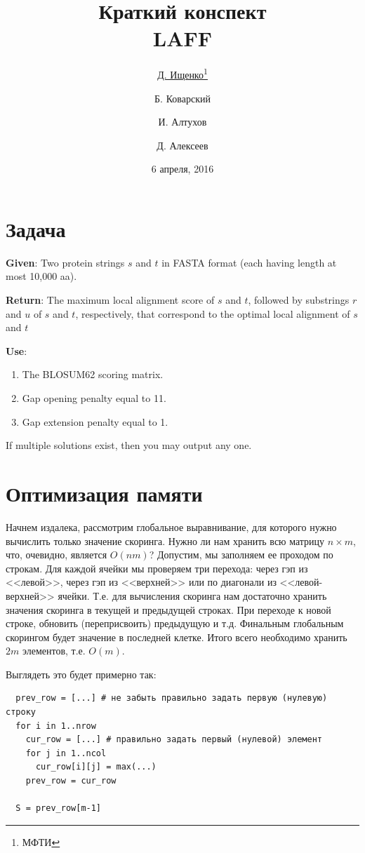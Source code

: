 \documentclass[letterpaper, 11pt]{article}
\title{\large{Краткий конспект}\\
\LARGE{LAFF}}
\date{6 апреля, 2016}
\author{\underline{Д. Ищенко\thanks{МФТИ}} \and Б. Коварский\footnotemark[1]
\and И. Алтухов\footnotemark[1] \and Д. Алексеев\footnotemark[1]}
\begin{document}
\maketitle
\thispagestyle{empty}
\clearpage

\section{Задача}

\textbf{Given}: Two protein strings $s$ and $t$ in FASTA format (each having length at most 10,000 aa).

\textbf{Return}: The maximum local alignment score of $s$ and $t$, followed by substrings $r$ and $u$ of $s$ and $t$, respectively, that correspond to the optimal local alignment of $s$ and $t$

\textbf{Use}:
\begin{enumerate}
\item
The BLOSUM62 scoring matrix.
\item
Gap opening penalty equal to 11.
\item
Gap extension penalty equal to 1.
\end{enumerate}

If multiple solutions exist, then you may output any one.

\section{Оптимизация памяти}
Начнем издалека, рассмотрим глобальное выравнивание, для которого нужно вычислить только значение скоринга. Нужно ли нам хранить всю матрицу $n \times m$, что, очевидно, является $O(nm)$? Допустим, мы заполняем ее проходом по строкам. Для каждой ячейки мы проверяем три перехода: через гэп из <<левой>>, через гэп из <<верхней>> или по диагонали из <<левой-верхней>> ячейки. Т.е. для вычисления скоринга нам достаточно хранить значения скоринга в текущей и предыдущей строках. При переходе к новой строке, обновить (переприсвоить) предыдущую и т.д. Финальным глобальным скорингом будет значение в последней клетке. Итого всего необходимо хранить $2m$ элементов, т.е. $O(m)$.

Выглядеть это будет примерно так:
\begin{verbatim}
  prev_row = [...] # не забыть правильно задать первую (нулевую) строку
  for i in 1..nrow
    cur_row = [...] # правильно задать первый (нулевой) элемент
    for j in 1..ncol
      cur_row[i][j] = max(...)
    prev_row = cur_row
  
  S = prev_row[m-1]
\end{verbatim}
\end{document}
